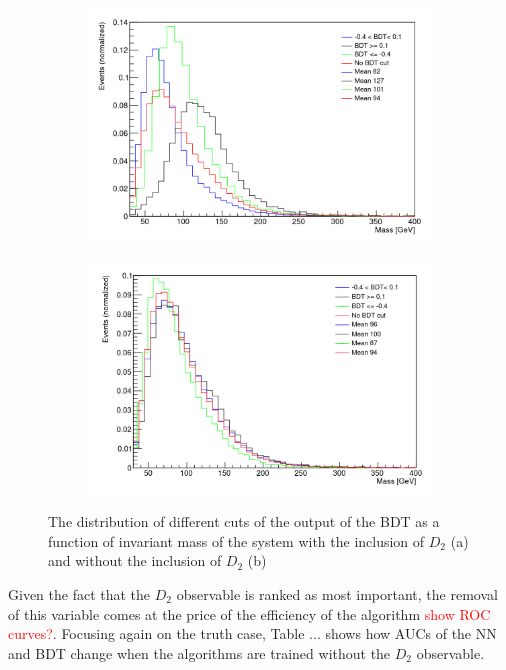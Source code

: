 \documentclass[10pt,a4paper]{book}
\newcommand\todo[1]{\textcolor{red}{#1}}
\begin{document}
\begin{figure}[h]
\begin{subfigure}{1.0\textwidth}
\centering
\includegraphics[scale=0.35]{ch4_images/bdt_with_d2}
\caption{}
\label{bdt with d2}
\end{subfigure}
\begin{subfigure}{1.0\textwidth}
\centering
\includegraphics[scale=0.35]{ch4_images/bdt_wo_d2}
\caption{}
\label{bdt w/o d2}
\end{subfigure}
\caption{The distribution of different cuts of the output of the BDT as a function of invariant mass of the system with the inclusion of $D_2$ (a) and without the inclusion of $D_2$ (b)}
\end{figure} 

Given the fact that the $D_2$ observable is ranked as most important, the removal of this variable comes at the price of the efficiency of the algorithm \todo{show ROC curves?}. Focusing again on the truth case, Table ... shows how AUCs of the NN and BDT change when the algorithms are trained without the $D_2$ observable.
\end{document}
